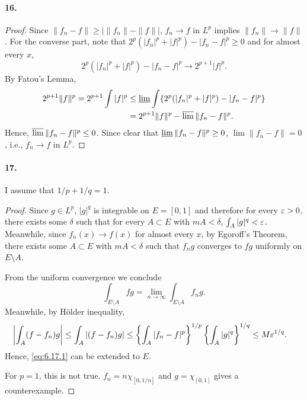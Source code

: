   \paragraph{16.}
  \begin{proof}
    Since $\|f_n-f\| \ge |\|f_n\|-\|f\||$, $f_n\to f$ in $L^p$ implies $\|f_n\|
    \to \|f\|$. For the converse part, note that $2^p(|f_n|^p+|f|^p)-|f_n-f|^p
    \ge 0$ and for almost every $x$,
    \[
      2^p(|f_n|^p+|f|^p)-|f_n-f|^p \to 2^{p+1}|f|^p.
    \]
    By Fatou's Lemma,
    \begin{align*}
      2^{p+1}\|f\|^p = 2^{p+1}\int|f|^p 
      &\le \operatorname*{\underline{lim}}\int\{2^p(|f_n|^p+|f|^p)-|f_n-f|^p\} \\
      &= 2^{p+1}\|f\|^p - \operatorname*{\overline{lim}}\|f_n-f\|^p.
    \end{align*}
    Hence, $\operatorname*{\overline{lim}}\|f_n-f\|^p \le 0$. Since clear that $\operatorname*{\underline{lim}}\|f_n-f\|^p\ge0$,
    $\lim\|f_n-f\|=0$, i.e., $f_n \to f$ in $L^p$.
  \end{proof}

  \paragraph{17.}
    I assume that $1/p+1/q=1$.
  \begin{proof}
    Since $g\in L^p$, $|g|^q$ is integrable on $E=[0,1]$ and therefore for every
    $\varepsilon>0$, there exists some $\delta$ such that for every $A\subset E$ with
    $mA<\delta$, $\int_A|g|^q<\varepsilon$. Meanwhile, since $f_n(x)\to f(x)$ for 
    almost every $x$, by Egoroff's Theorem, there exists some $A\subset E$ with
    $mA<\delta$ such that $f_ng$ converges to $fg$ uniformly on $E\setminus A$.
    \par
    From the uniform convergence we conclude
    \begin{equation}
      \label{eq:6.17.1}
      \int_{E\setminus A} fg = \lim_{n\to\infty}\int_{E\setminus A}f_ng.
    \end{equation}
    Meanwhile, by Hölder inequality,
    \begin{align*}
      \left|\int_A (f-f_n)g\right| \le \int_A|(f-f_n)g|
      &\le\left\{\int_A|f_n-f|^p\right\}^{1/p}\left\{\int_A|g|^q\right\}^{1/q}
      \le M\varepsilon^{1/q}.
    \end{align*}
    Hence, \eqref{eq:6.17.1} can be extended to $E$.\par
    For $p=1$, this is not true. $f_n=n\chi_{[0,1/n]}$ and $g=\chi_{[0,1]}$ 
    gives a counterexample.
  \end{proof}

